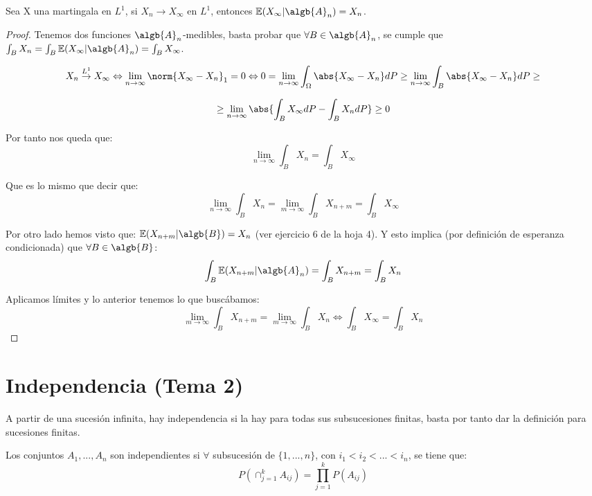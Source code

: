 \documentclass{apuntes}
\begin{document}
\begin{theorem}
Sea X una martingala en $L^1$, si $X_n \rightarrow X_{\infty}$ en $L^1$, entonces $\mathbb{E}(X_{\infty}|\algb{A}_n)=X_n$.
\end{theorem}
\begin{proof}
Tenemos dos funciones $\algb{A}_n$-medibles, basta probar que $\forall B \in \algb{A}_n$, se cumple que $\int_B X_n = \int_B \mathbb{E}(X_{\infty}|\algb{A}_n) = \int_B X_{\infty}$.

\[
X_n \stackrel{L^1}{\rightarrow} X_{\infty} \Leftrightarrow \lim_{n \rightarrow \infty} \norm{X_{\infty}-X_n}_1=0 \Leftrightarrow 0= \lim_{n \rightarrow \infty} \int_{\Omega}\abs{X_{\infty}-X_n}dP \geq \lim_{n \rightarrow \infty} \int_B \abs{X_{\infty}-X_n}dP\geq
\]

\[
\geq \lim_{n \rightarrow \infty} \abs{\int_B X_{\infty}dP- \int_B X_n dP} \geq 0
\]


Por tanto nos queda que:
\[
\lim_{n \rightarrow \infty} \int_B X_n = \int_B X_{\infty}
\]

Que es lo mismo que decir que:
\[
\lim_{n \rightarrow \infty} \int_B X_n = \lim_{m \rightarrow \infty} \int_B X_{n+m} = \int_B X_{\infty}
\]

Por otro lado hemos visto que: $\mathbb{E}(X_{n+m}|\algb{B}) = X_n$ (ver ejercicio 6 de la hoja 4). Y esto implica (por definición de esperanza condicionada) que $\forall B \in \algb{B}$:
\[
\int_B \mathbb{E}(X_{n+m}|\algb{A}_n)=\int_B X_{n+m} = \int_B X_n
\]

Aplicamos límites y  lo anterior tenemos lo que buscábamos:
\[
\lim_{m \rightarrow \infty}\int_B X_{n+m} = \lim_{m \rightarrow \infty}\int_B X_{n} \Leftrightarrow \int_B X_{\infty} = \int_B X_n
\]

\end{proof}

\chapter{Independencia (Tema 2)}

A partir de una sucesión infinita, hay independencia si la hay para todas sus subsucesiones finitas, basta por tanto dar la definición para sucesiones finitas.

\begin{defn}
Los conjuntos $A_1,...,A_n$ son independientes si $\forall$ subsucesión de $\{1,...,n\}$, con $i_1 < i_2 < ... < i_n$, se tiene que:
\[
P(\cap_{j=1}^k A_{ij}) = \prod_{j=1}^{k}P(A_{ij})
\]
\end{defn}
\end{document}
